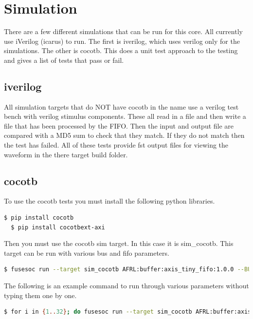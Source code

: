 \newpage

\section{Simulation}
\par
There are a few different simulations that can be run for this core. All currently use iVerilog (icarus) to run. The first is iverilog, which
uses verilog only for the simulations. The other is cocotb. This does a unit test approach to the testing and gives a list of tests that pass
or fail.

\subsection{iverilog}
\par
All simulation targets that do NOT have cocotb in the name use a verilog test bench with verilog stimulus components. These all read in a file
and then write a file that has been processed by the FIFO. Then the input and output file are compared with a MD5 sum to check that they
match. If they do not match then the test has failed. All of these tests provide fst output files for viewing the waveform in the there
target build folder.

\subsection{cocotb}
\par
To use the cocotb tests you must install the following python libraries.
\begin{lstlisting}[language=bash]
  $ pip install cocotb
  $ pip install cocotbext-axi
\end{lstlisting}

Then you must use the cocotb sim target. In this case it is sim\_cocotb. This target can be run with various bus and fifo parameters.
\begin{lstlisting}[language=bash]
  $ fusesoc run --target sim_cocotb AFRL:buffer:axis_tiny_fifo:1.0.0 --BUS_WIDTH=8 --FIFO_DEPTH=32
\end{lstlisting}

The following is an example command to run through various parameters without typing them one by one.
\begin{lstlisting}[language=bash]
  $ for i in {1..32}; do fusesoc run --target sim_cocotb AFRL:buffer:axis_tiny_fifo:1.0.0 --BUS_WIDTH=$i --FIFO_DEPTH=$(shuf -i 1-32 -n 1); done
\end{lstlisting}

